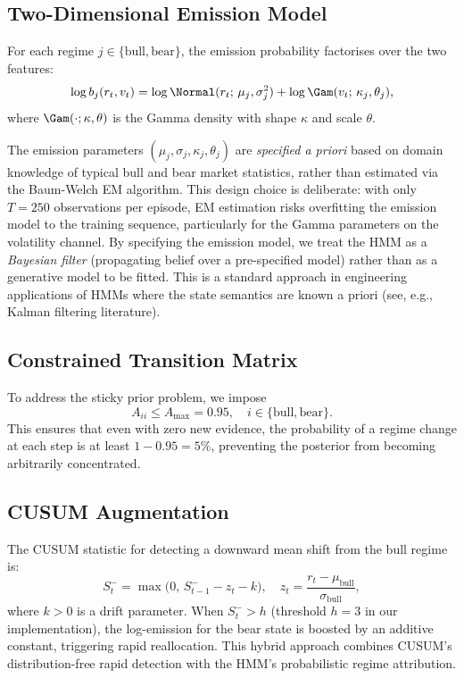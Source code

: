 \subsection{Two-Dimensional Emission Model}

For each regime $j \in \{\text{bull}, \text{bear}\}$, the emission
probability factorises over the two features:
\begin{equation}
\label{eq:emission}
    \log b_j(r_t, v_t) = \log \Normal(r_t;\, \mu_j, \sigma_j^2) + 
    \log \Gam(v_t;\, \kappa_j, \theta_j),
\end{equation}
where $\Gam(\cdot;\kappa, \theta)$ is the Gamma density with shape $\kappa$
and scale $\theta$.

\begin{remark}
\label{rem:hmm-fixed}
    The emission parameters $(\mu_j, \sigma_j, \kappa_j, \theta_j)$ are
    \emph{specified a priori} based on domain knowledge of typical bull and
    bear market statistics, rather than estimated via the Baum-Welch EM
    algorithm. This design choice is deliberate: with only $T = 250$
    observations per episode, EM estimation risks overfitting the emission
    model to the training sequence, particularly for the Gamma parameters on
    the volatility channel. By specifying the emission model, we treat the
    HMM as a \emph{Bayesian filter} (propagating belief over a pre-specified
    model) rather than as a generative model to be fitted. This is a standard
    approach in engineering applications of HMMs where the state semantics
    are known a priori (see, e.g., Kalman filtering literature).
\end{remark}

\subsection{Constrained Transition Matrix}

To address the sticky prior problem, we impose
\[
    A_{ii} \leq A_{\max} = 0.95, \quad i \in \{\text{bull}, \text{bear}\}.
\]
This ensures that even with zero new evidence, the probability of a regime
change at each step is at least $1 - 0.95 = 5\%$, preventing the posterior
from becoming arbitrarily concentrated.

\subsection{CUSUM Augmentation}

The CUSUM statistic for detecting a downward mean shift from the bull
regime is:
\[
    S_t^- = \max\!\bigl(0,\, S_{t-1}^- - z_t - k\bigr), \quad
    z_t = \frac{r_t - \mu_{\text{bull}}}{\sigma_{\text{bull}}},
\]
where $k > 0$ is a drift parameter. When $S_t^- > h$ (threshold $h = 3$
in our implementation), the log-emission for the bear state is boosted by
an additive constant, triggering rapid reallocation. This hybrid approach
combines CUSUM's distribution-free rapid detection with the HMM's
probabilistic regime attribution.

